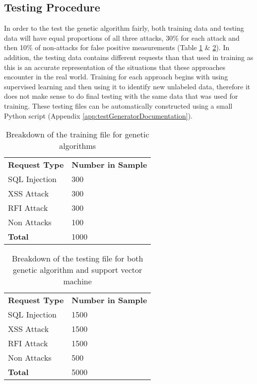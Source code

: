 \subsection{Testing Procedure}

In order to the test the genetic algorithm fairly, both training data and testing data will have equal proportions of all three attacks, 30\% for each attack and then 10\% of non-attacks for false positive measurements (Table \ref{tab:trainingfile} \& \ref{tab:testfile}).  In addition, the testing data contains different requests than that used in training as this is an accurate representation of the situations that these approaches encounter in the real world.  Training for each approach begins with using supervised learning and then using it to identify new unlabeled data, therefore it does not make sense to do final testing with the same data that was used for training.  These testing files can be automatically constructed using a small Python script (Appendix \ref{app:testGeneratorDocumentation}).

\begin{table}
	\centering
	\begin{tabular}{|p{1.5in}|p{2.0in}|}
	\hline
		\textbf{Request Type} & \textbf{Number in Sample}\\
	\hhline{|=|=|}
		SQL Injection & 300 \\
	\hline
		XSS Attack & 300 \\
	\hline
		RFI Attack & 300 \\
	\hline
		Non Attacks & 100 \\
	\hhline{|=|=|}
		\textbf{Total} & 1000 \\
	\hline
	\end{tabular}
	\caption{Breakdown of the training file for genetic algorithms}
	\label{tab:trainingfile}
\end{table}

\begin{table}
	\centering
	\begin{tabular}{|p{1.5in}|p{2.0in}|}
	\hline
		\textbf{Request Type} & \textbf{Number in Sample}\\
	\hhline{|=|=|}
		SQL Injection & 1500 \\
	\hline
		XSS Attack & 1500 \\
	\hline
		RFI Attack & 1500 \\
	\hline
		Non Attacks & 500 \\
	\hhline{|=|=|}
		\textbf{Total} & 5000 \\
	\hline
	\end{tabular}
	\caption{Breakdown of the testing file for both genetic algorithm and support vector machine}
	\label{tab:testfile}
\end{table}

